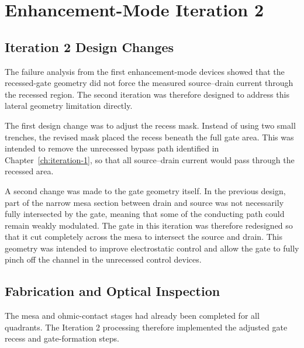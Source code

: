 \chapter{Enhancement-Mode Iteration 2}
\label{ch:iteration-2}

\section{Iteration 2 Design Changes}

The failure analysis from the first enhancement-mode devices showed that the recessed-gate
geometry did not force the measured source--drain current through the
recessed region. The second iteration was therefore designed to address this lateral
geometry limitation directly.

\vspace{1mm}

The first design change was to adjust the recess mask. Instead of using two
small trenches, the revised mask placed
the recess beneath the full gate area. This was intended to remove
the unrecessed bypass path identified in Chapter~\ref{ch:iteration-1}, so that
all source--drain current would pass through the recessed area.

\vspace{1mm}

A second change was made to the gate geometry itself. In the previous design,
part of the narrow mesa section between drain and source was not necessarily
fully intersected by the gate, meaning that some of the conducting path could
remain weakly modulated. The gate in this iteration was therefore redesigned so
that it cut completely across the mesa to intersect the source and drain. This
geometry was intended to improve electrostatic control and allow the gate to
fully pinch off the channel in the unrecessed control devices.

\vspace{4mm}



\vspace{1mm}

\section{Fabrication and Optical Inspection}

The mesa and ohmic-contact stages had already been completed for all quadrants.
The Iteration 2 processing therefore implemented the adjusted gate recess and
gate-formation steps.

